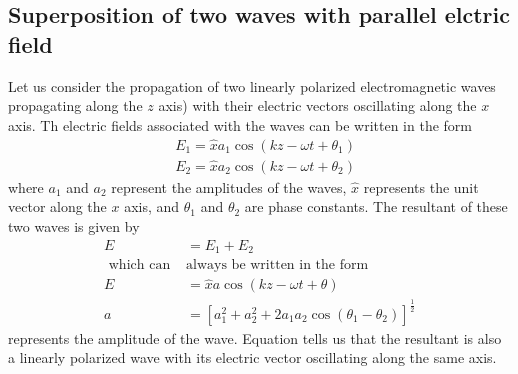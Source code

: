  \subsection{ Superposition of two waves with parallel elctric field}
 Let us consider the propagation of two linearly polarized electromagnetic waves propagating along the $z$ axis) with their electric vectors oscillating along the $x$ axis. Th electric fields associated with the waves can be written in the form
 $$
 \begin{aligned}
 &E_{1}=\hat{x} a_{1} \cos \left(k z-\omega t+\theta_{1}\right) \\
 &E_{2}=\hat{x} a_{2} \cos \left(k z-\omega t+\theta_{2}\right)
 \end{aligned}
 $$
 where $a_{1}$ and $a_{2}$ represent the amplitudes of the waves, $\hat{x}$ represents the unit vector along the $x$ axis, and $\theta_{1}$ and $\theta_{2}$ are phase constants. The resultant of these two waves is given by
 $$
 \begin{aligned}
 E&=E_{1}+E_{2}\\
\text{ which can }&\text{always be written in the form}\\
 E&=\hat{x} a \cos (k z-\omega t+\theta) \\
 a&=\left[a_{1}^{2}+a_{2}^{2}+2 a_{1} a_{2} \cos \left(\theta_{1}-\theta_{2}\right)\right]^{\frac{1}{2}}
 \end{aligned}
 $$
represents the amplitude of the wave. Equation tells us that the resultant is also a linearly polarized wave with its electric vector oscillating along the same axis.
